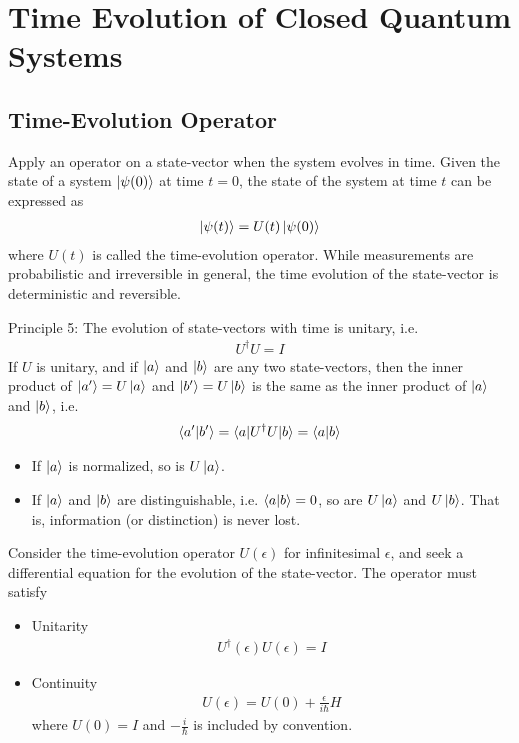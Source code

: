 \newpage
\section{Time Evolution of Closed Quantum Systems}

\subsection{Time-Evolution Operator}
Apply an operator on a state-vector when the system evolves in time. Given the state of a system $\ket{\psi(0)}$ at time $t=0$, the state of the system at time $t$ can be expressed as 
\begin{align*}
    \ket{\psi(t)}=U(t)\ket{\psi(0)}
\end{align*}
where $U(t)$ is called the time-evolution operator. While measurements are probabilistic and irreversible in general, the time evolution of the state-vector is deterministic and reversible. 

Principle 5: The evolution of state-vectors with time is unitary, i.e.
\begin{align*}
    U^{\dagger}U=I
\end{align*}
If $U$ is unitary, and if $\ket{a}$ and $\ket{b}$ are any two state-vectors, then the inner product of $\ket{a'}=U\ket{a}$ and $\ket{b'}=U\ket{b}$ is the same as the inner product of $\ket{a}$ and $\ket{b}$, i.e.
\begin{align*}
    \braket{a'|b'}=\braket{a|U^\dagger U |b}=\braket{a|b}
\end{align*}
\begin{itemize}
    \item If $\ket{a}$ is normalized, so is $U\ket{a}$. 
    \item If $\ket{a}$ and $\ket{b}$ are distinguishable, i.e. $\braket{a|b}=0$, so are $U\ket{a}$ and $U\ket{b}$. That is, information (or distinction) is never lost. 
\end{itemize}

Consider the time-evolution operator $U(\epsilon)$ for infinitesimal $\epsilon$, and seek a differential equation for the evolution of the state-vector. The operator must satisfy
\begin{itemize}
    \item Unitarity\begin{align*}
        U^\dagger (\epsilon)U(\epsilon)=I
    \end{align*}
    \item Continuity\begin{align*}
        U(\epsilon)=U(0)+\frac{\epsilon}{i\hbar}H
    \end{align*}
    where $U(0)=I$ and $-\frac{i}{\hbar}$ is included by convention. 
\end{itemize}

